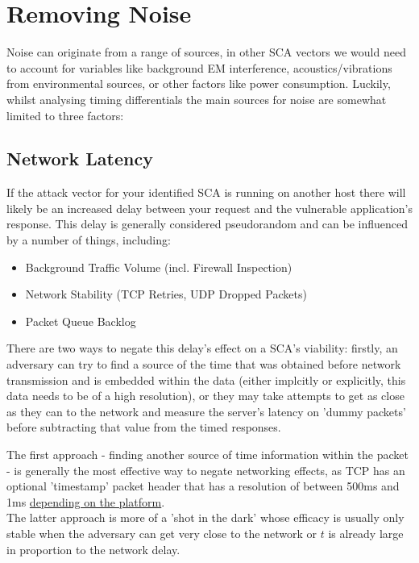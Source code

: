 \section{Removing Noise}
		
			Noise can originate from a range of sources, in other SCA vectors we would need to account for variables like background EM interference,
			acoustics/vibrations from environmental sources, or other factors like power consumption. Luckily, whilst analysing timing differentials the main sources for noise
			are somewhat limited to three factors:

\subsection{Network Latency}
			
				If the attack vector for your identified SCA is running on another host there will likely be an increased delay between your request and the vulnerable
				application's response. This delay is generally considered pseudorandom and can be influenced by a number of things, including:
			
				
\begin{itemize}
\item Background Traffic Volume (incl. Firewall Inspection)
\item Network Stability (TCP Retries, UDP Dropped Packets)
\item Packet Queue Backlog
\end{itemize}
				
			
				There are two ways to negate this delay's effect on a SCA's viability: firstly, an adversary can try to find a source of the time that was
				obtained before network transmission and is embedded within the data (either implcitly or explicitly, this data needs to be of a high resolution),
				or they may take attempts to get as close as they can to the network and measure the server's latency on 'dummy packets' before subtracting
				that value from the timed responses.
			
				The first approach - finding another source of time information within the packet - is generally the most effective way to negate networking effects,
				as TCP has an optional 'timestamp' packet header that has a resolution of between 500ms and 1ms \href{https://marc.info/?l=intrusions&m=104356240325628&w=2}{depending on the platform}.
				\\

				The latter approach is more of a 'shot in the dark' whose efficacy is usually only stable when the adversary can get very close to the network or
				\emph{$t$} is already large in proportion to the network delay.
			
